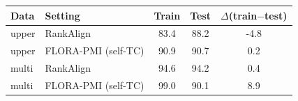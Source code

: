 \begin{tabular}{llccc}
\toprule
Data & Setting & Train & Test & $\Delta$(train$-$test) \\
\midrule
upper & RankAlign & 83.4 & 88.2 & -4.8 \\
upper & FLORA-PMI (self-TC) & 90.9 & 90.7 & 0.2 \\
multi & RankAlign & 94.6 & 94.2 & 0.4 \\
multi & FLORA-PMI (self-TC) & 99.0 & 90.1 & 8.9 \\
\bottomrule
\end{tabular}
